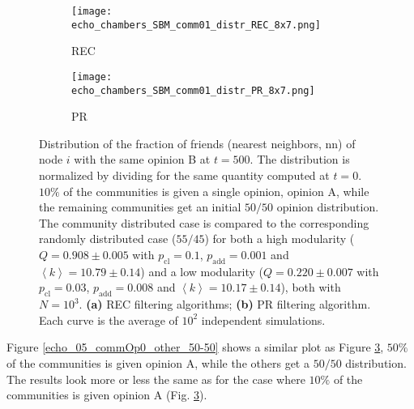 \documentclass[11 pt , letterpaper , twoside , openright]{book}
\begin{document}
\begin{figure}[H]
  \begin{subfigure}[b]{0.49\textwidth}
    \caption{REC}
  	\texttt{[image: echo\_chambers\_SBM\_comm01\_distr\_REC\_8x7.png]}
    \label{rec_comm_echo}
  \end{subfigure}
  \begin{subfigure}[b]{0.49\textwidth}
    \caption{PR}
  	\texttt{[image: echo\_chambers\_SBM\_comm01\_distr\_PR\_8x7.png]}
    \label{pr_comm_echo}
  \end{subfigure}
  \captionsetup{format=plain}
  \caption[Distribution of the fraction of friends (nearest neighbors, nn) of node $i$ with the same opinion B at $t = 500$. $10 \%$ of the communities is given a single opinion, opinion A, while the remaining communities get an initial $50/50$ opinion distribution. The community distributed case is compared to the corresponding randomly distributed case ($55/45$) for both a high modularity and a low modularity network. Results for the REC and PR filtering algorithm.]{Distribution of the fraction of friends (nearest neighbors, nn) of node $i$ with the same opinion B at $t = 500$. The distribution is normalized by dividing for the same quantity computed at $t=0$. $10 \%$ of the communities is given a single opinion, opinion A, while the remaining communities get an initial $50/50$ opinion distribution. The community distributed case is compared to the corresponding randomly distributed case ($55/45$) for both a high modularity ($Q = 0.908 \pm 0.005$ with $p_{\text{cl}} = 0.1$, $p_{\text{add}} = 0.001$ and $\left<k\right> = 10.79 \pm 0.14$) and a low modularity ($Q = 0.220 \pm 0.007$ with $p_{\text{cl}} = 0.03$, $p_{\text{add}} = 0.008$ and $\left<k\right> = 10.17 \pm 0.14$), both with $N=10^3$. \textbf{(a)} REC filtering algorithms; \textbf{(b)} PR filtering algorithm. Each curve is the average of $10^2$ independent simulations.}
\label{echo_01_commOp0_other_50-50}
\end{figure}
\noindent
Figure \ref{echo_05_commOp0_other_50-50} shows a similar plot as Figure \ref{echo_01_commOp0_other_50-50}, $50 \%$ of the communities is given opinion A, while the others get a $50/50$ distribution. The results look more or less the same as for the case where $10 \%$ of the communities is given opinion A (Fig. \ref{echo_01_commOp0_other_50-50}).\\
\newline
\end{document}
